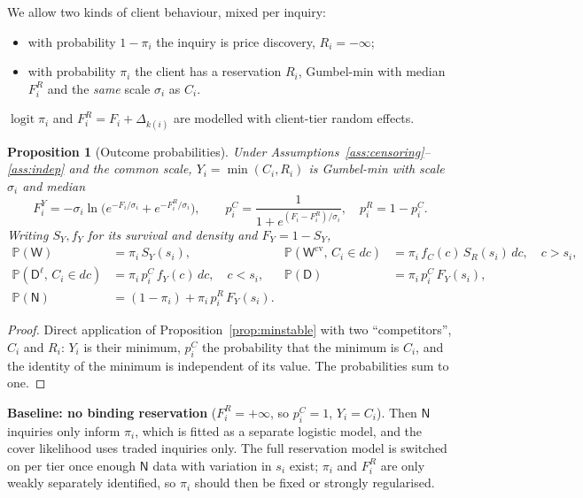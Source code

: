\documentclass[11pt,a4paper]{article}
\newtheorem{proposition}{Proposition}
\theoremstyle{definition}
\theoremstyle{remark}
\newcommand{\Prob}{\mathbb{P}}
\newcommand{\Win}{\mathsf{W}}
\newcommand{\Wc}{\mathsf{W}^{\mathrm{cv}}}
\newcommand{\Dl}{\mathsf{D}^{\ell}}
\newcommand{\Dn}{\mathsf{D}}
\newcommand{\NT}{\mathsf{N}}
\begin{document}
We allow two kinds of client behaviour, mixed per inquiry:
\begin{itemize}[itemsep=1pt]
\item with probability $1-\pi_i$ the inquiry is price discovery, $R_i=-\infty$;
\item with probability $\pi_i$ the client has a reservation $R_i$, Gumbel-min with median $F^R_i$ and the \emph{same} scale $\sigma_i$ as $C_i$.
\end{itemize}
$\operatorname{logit}\pi_i$ and $F^R_i=F_i+\Delta_{k(i)}$ are modelled with client-tier random effects.

\begin{proposition}[Outcome probabilities]\label{prop:outcomes}
Under Assumptions~\ref{ass:censoring}--\ref{ass:indep} and the common scale, $Y_i=\min(C_i,R_i)$ is Gumbel-min with scale $\sigma_i$ and median
\[
F^Y_i=-\sigma_i\ln\!\bigl(e^{-F_i/\sigma_i}+e^{-F^R_i/\sigma_i}\bigr),
\qquad
p^C_i=\frac{1}{1+e^{(F_i-F^R_i)/\sigma_i}},\quad p^R_i=1-p^C_i .
\]
Writing $S_Y,f_Y$ for its survival and density and $F_Y=1-S_Y$,
\begin{align*}
\Prob(\Win) &= \pi_i\,S_Y(s_i), &
\Prob(\Wc,\,C_i\in dc) &= \pi_i\,f_C(c)\,S_R(s_i)\,dc,\quad c>s_i,\\
\Prob(\Dl,\,C_i\in dc) &= \pi_i\,p^C_i\,f_Y(c)\,dc,\quad c<s_i, &
\Prob(\Dn) &= \pi_i\,p^C_i\,F_Y(s_i),\\
\Prob(\NT) &= (1-\pi_i)+\pi_i\,p^R_i\,F_Y(s_i). &&
\end{align*}
\end{proposition}
\begin{proof}
Direct application of Proposition~\ref{prop:minstable} with two ``competitors'', $C_i$ and $R_i$: $Y_i$ is their minimum, $p^C_i$ the probability that the minimum is $C_i$, and the identity of the minimum is independent of its value. The probabilities sum to one.
\end{proof}

\begin{decision}
\textbf{Baseline: no binding reservation} ($F^R_i=+\infty$, so $p^C_i=1$, $Y_i=C_i$). Then $\NT$ inquiries only inform $\pi_i$, which is fitted as a separate logistic model, and the cover likelihood uses traded inquiries only. The full reservation model is switched on per tier once enough $\NT$ data with variation in $s_i$ exist; $\pi_i$ and $F^R_i$ are only weakly separately identified, so $\pi_i$ should then be fixed or strongly regularised.
\end{decision}
\end{document}
